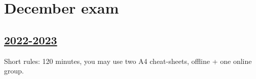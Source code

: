 


\newpage
\thispagestyle{empty}
\section{December exam}
 
\subsection[2022-2023]{\hyperref[sec:sol_kr_02_2022_2023]{2022-2023}}
\label{sec:kr_02_2022_2023} %



Short rules: 120 minutes, you may use two A4 cheat-sheets, offline + one online group.

